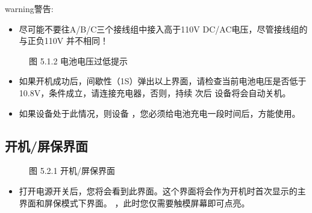 \documentclass[a4paper,10pt,english]{sphinxmanual}
\begin{document}
\begin{sphinxadmonition}{warning}{警告:}\begin{itemize}
\item {} 
\sphinxAtStartPar
尽可能不要往A/B/C三个接线组中接入高于110V DC/AC电压，尽管接线组的  与正负110V  并不相同！

\end{itemize}
\end{sphinxadmonition}

\begin{figure}[htbp]
\centering
\capstart

\noindent{}
\caption{图 5.1.2 电池电压过低提示}\label{\detokenize{operation_guide:id7}}\end{figure}
\begin{itemize}
\item {} 
\sphinxAtStartPar
如果开机成功后，间歇性（1S）弹出以上界面，请检查当前电池电压是否低于10.8V，条件成立，请连接充电器，否则，持续  次后
设备将会自动关机。

\item {} 
\sphinxAtStartPar
如果设备处于此情况，则设备 ，您必须给电池充电一段时间后，方能使用。

\end{itemize}


\subsection{开机/屏保界面}
\label{\detokenize{operation_guide:id3}}
\begin{figure}[htbp]
\centering
\capstart

\noindent{}
\caption{图 5.2.1 开机/屏保界面}\label{\detokenize{operation_guide:id8}}\end{figure}
\begin{itemize}
\item {} 
\sphinxAtStartPar
打开电源开关后，您将会看到此界面。这个界面将会作为开机时首次显示的主界面和屏保模式下界面。
 ，此时您仅需要触模屏幕即可点亮。

\end{itemize}
\end{document}
